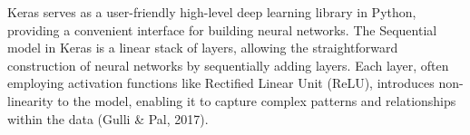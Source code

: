 Keras serves as a user-friendly high-level deep learning library in Python, providing a convenient interface for building neural networks. The Sequential model in Keras is a linear stack of layers, allowing the straightforward construction of neural networks by sequentially adding layers. Each layer, often employing activation functions like Rectified Linear Unit (ReLU), introduces non-linearity to the model, enabling it to capture complex patterns and relationships within the data (Gulli \& Pal, 2017). 

